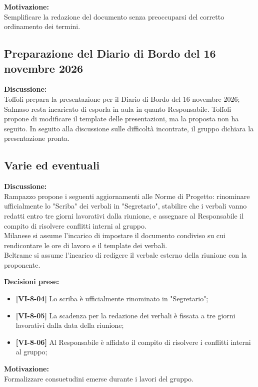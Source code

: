 \documentclass[12pt,a4paper]{article}
\newcommand{\tightlist}{\setlength{\itemsep}{1pt}\setlength{\parskip}{0pt}}
\begin{document}
\textbf{Motivazione:} \\
Semplificare la redazione del documento senza preoccuparsi del corretto ordinamento dei termini.

\hypertarget{odg-4}{%
\subsection{Preparazione del Diario di Bordo del 16 novembre 2026}}
\textbf{Discussione:} \\
Toffoli prepara la presentazione per il Diario di Bordo del 16 novembre 2026; Salmaso resta incaricato di esporla in aula in quanto Responsabile. Toffoli propone di modificare il template delle presentazioni, ma la proposta non ha seguito.
In seguito alla discussione sulle difficoltà incontrate, il gruppo dichiara la presentazione pronta.

\hypertarget{varie-ed-eventuali}{%
\subsection{Varie ed eventuali}}
\textbf{Discussione:} \\
Rampazzo propone i seguenti aggiornamenti alle Norme di Progetto: rinominare ufficialmente lo "Scriba" dei verbali in "Segretario", stabilire che i verbali vanno redatti entro tre giorni lavorativi dalla riunione, e assegnare al Responsabile il compito di risolvere conflitti interni al gruppo. \\
Milanese si assume l'incarico di impostare il documento condiviso su cui rendicontare le ore di lavoro e il template dei verbali. \\
Beltrame si assume l'incarico di redigere il verbale esterno della riunione con la proponente.

\textbf{Decisioni prese:}
\begin{itemize}
\tightlist
\item[$\checkmark$] \textbf{[VI-8-04]} Lo scriba è ufficialmente rinominato in "Segretario";
\item[$\checkmark$] \textbf{[VI-8-05]} La scadenza per la redazione dei verbali è fissata a tre giorni lavorativi dalla data della riunione;
\item[$\checkmark$] \textbf{[VI-8-06]} Al Responsabile è affidato il compito di risolvere i conflitti interni al gruppo;
\end{itemize}

\textbf{Motivazione:} \\
Formalizzare consuetudini emerse durante i lavori del gruppo.
\end{document}
